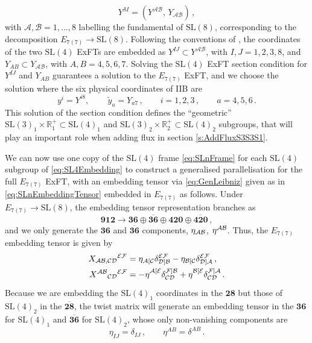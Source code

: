 \documentclass[a4paper, 11pt]{article}
\numberwithin{equation}{section}
\newcommand{\SL}[1]{\mathrm{SL}( #1 )}
\newcommand{\En}[1]{E_{#1(#1)}}
\newcommand{\+}{\oplus}
\newcommand{\cA}{\mathcal{A}}
\newcommand{\cB}{\mathcal{B}}
\newcommand{\cC}{\mathcal{C}}
\begin{document}
\begin{equation}
	Y^M = \left( Y^{\cA\cB} ,\, Y_{\cA\cB} \right) \,,
\end{equation}
with $\cA, \cB = 1, \ldots, 8$ labelling the fundamental of $\SL{8}$, corresponding to the decomposition $\En{7} \rightarrow \SL{8}$. Following the conventions of \cite{Inverso:2016eet}, the coordinates of the two $\SL{4}$ ExFTs are embedded as $Y^{IJ} \subset Y^{\cA\cB}$, with $I, J = 1, 2, 3, 8$, and $Y_{AB} \subset Y_{\cA\cB}$, with $A, B = 4, 5, 6, 7$. Solving the $\SL{4}$ ExFT section condition for $Y^{IJ}$ and $Y_{AB}$ guarantees a solution to the $\En{7}$ ExFT, and we choose the solution where the six physical coordinates of IIB are
\begin{equation} \label{eq:PhysicalCoords}
	y^i = Y^{i8},\, \qquad \tilde{y}_a = Y_{a7} \,, \qquad i = 1, 2, 3 \,, \qquad a = 4, 5, 6 \,.
\end{equation}
This solution of the section condition defines the ``geometric'' $\SL{3}_1 \times \mathbb{R}^+_1 \subset \SL{4}_1$ and $\SL{3}_2 \times \mathbb{R}^+_2 \subset \SL{4}_2$ subgroups, that will play an important role when adding flux in section \ref{s:AddFluxS3S3S1}.

We can now use one copy of the $\SL{4}$ frame \eqref{eq:SLnFrame} for each $\SL{4}$ subgroup of \eqref{eq:SL4Embedding} to construct a generalised parallelisation for the full $\En{7}$ ExFT, with an embedding tensor via \eqref{eq:GenLeibniz} given as in \eqref{eq:SLnEmbeddingTensor} embedded in $\En{7}$ as follows. Under $\En{7} \rightarrow \SL{8}$, the embedding tensor representation branches as
\begin{equation}
	\mathbf{912} \rightarrow \mathbf{36} \oplus \overline{\mathbf{36}} \oplus \mathbf{420} \oplus \overline{\mathbf{420}} \,,
\end{equation}
and we only generate the $\mathbf{36}$ and $\overline{\mathbf{36}}$ components, $\eta_{{\cal AB}}$, $\eta^{{\cal AB}}$. Thus, the $\En{7}$ embedding tensor is given by
\begin{equation}
	\begin{split}
		X_{{\cal AB, CD}}{}^{\cal EF} &= \eta_{\cA[\cC} \delta_{{\cal D}]\cB}^{{\cal EF}} - \eta_{\cB[\cC} \delta_{{\cal D}]\cA}^{{\cal EF}} \,, \\
		X^{{\cal AB}}{}_{{\cal CD}}{}^{\cal EF} &= -\eta^{\cA[{\cal E}}_{\phantom{[\cA]}} \delta_{\cC{\cal D}}^{{\cal F}]{\cal B}} + \eta^{\cB[{\cal E}}_{\phantom{[\cA]}} \delta_{\cC{\cal D}}^{{\cal F}]{\cal A}} \,.
	\end{split}
\end{equation}
Because we are embedding the $\SL{4}_1$ coordinates in the $\mathbf{28}$ but those of $\SL{4}_2$ in the $\overline{\mathbf{28}}$, the twist matrix will generate an embedding tensor in the $\mathbf{36}$ for $\SL{4}_1$ and $\overline{\mathbf{36}}$ for $\SL{4}_2$, whose only non-vanishing components are
\begin{equation}
	\eta_{IJ} = \delta_{IJ} \,, \qquad \eta^{AB} = \delta^{AB} \,.
\end{equation}
\end{document}

